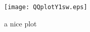 \documentclass{article}
\begin{document}
\begin{figure}[h]
\centering

\texttt{[image: QQplotY1sw.eps]}
\caption{a nice plot}
\label{fig:mesh1}
\end{figure}
\end{document}
